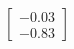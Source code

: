 \documentclass[preview]{standalone}
\begin{document}
\begin{align*}
\begin{bmatrix} -0.03 \\ -0.83 \end{bmatrix}
\end{align*}
\end{document}
